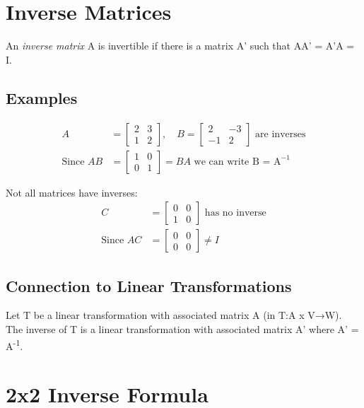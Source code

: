 \documentclass[12pt,a4paper]{article}
\begin{document}
\section{Inverse Matrices}

An \textit{inverse matrix} A is invertible if there is a matrix A' such that AA' = A'A = I.

\subsection{Examples}

\begin{align*}
A &= \begin{bmatrix} 2 & 3 \\ 1 & 2 \end{bmatrix}, \quad B = \begin{bmatrix} 2 & -3 \\ -1 & 2 \end{bmatrix} \text{ are inverses} \\
\text{Since } AB &= \begin{bmatrix} 1 & 0 \\ 0 & 1 \end{bmatrix} = BA \text{ we can write B = A}^{-1}
\end{align*}

Not all matrices have inverses:
\begin{align*}
C &= \begin{bmatrix} 0 & 0 \\ 1 & 0 \end{bmatrix} \text{ has no inverse} \\
\text{Since } AC &= \begin{bmatrix} 0 & 0 \\ 0 & 0 \end{bmatrix} \neq I
\end{align*}

\subsection{Connection to Linear Transformations}

Let T be a linear transformation with associated matrix A (in T:A x V→W).
The inverse of T is a linear transformation with associated matrix A' where A' = A\textsuperscript{-1}.

\section{2x2 Inverse Formula}
\end{document}
